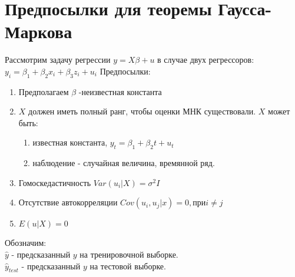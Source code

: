 \documentclass[12pt]{article} %
\theoremstyle{definition} %
\begin{document}
\section{Предпосылки для теоремы Гаусса-Маркова}
Рассмотрим задачу регрессии $y=X\beta+u$ в случае двух регрессоров: $y_i=\beta_1+\beta_2x_i+\beta_3z_i+u_i$
Предпосылки:
\begin{enumerate}
    \item Предполагаем $\beta$ -неизвестная константа
    \item $X$ должен иметь полный ранг, чтобы оценки МНК существовали. $X$ может быть:
    \begin{enumerate}
        \item известная константа, $y_t=\beta_1+\beta_2t+u_t$
        \item наблюдение - случайная величина, времянной ряд.
    \end{enumerate}
    \item Гомоскедастичность ${Var}(u_i|X)=\sigma^2I$
    \item Отсутствие автокорреляции
    ${Cov}(u_i,u_j|x)=0, при i\neq j$
    \item$ {E}(u|X)=0$
\end{enumerate}
Обозначим:\\
    $\hat{y}$  -  предсказанный $y$ на тренировочной выборке.\\
    $\hat{y}_{test}$  -  предсказанный $y$ на тестовой выборке.
\newpage
\end{document}
